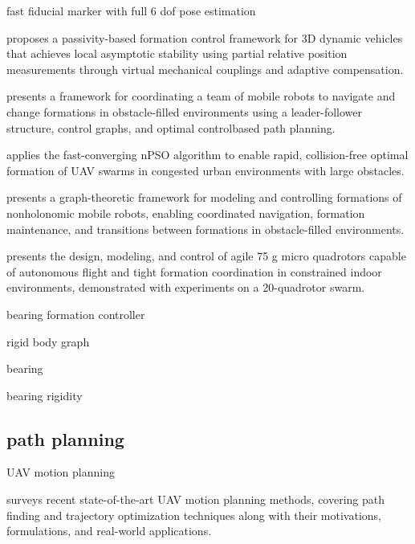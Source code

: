 \cite{ulrich2022towards} fast fiducial marker with full 6 dof pose estimation

\cite{stacey2015passivity} proposes a passivity-based formation control framework for 3D dynamic vehicles that achieves local asymptotic stability using partial relative position measurements through virtual mechanical couplings and adaptive compensation.

\cite{desai1999control} presents a framework for coordinating a team of mobile robots to navigate and change formations in obstacle-filled environments using a leader-follower structure, control graphs, and optimal control\-based path planning.

\cite{spanogianopoulos2017fast} applies the fast-converging nPSO algorithm to enable rapid, collision-free optimal formation of UAV swarms in congested urban environments with large obstacles.

\cite{desai2002modeling} presents a graph-theoretic framework for modeling and controlling formations of nonholonomic mobile robots, enabling coordinated navigation, formation maintenance, and transitions between formations in obstacle-filled environments.

\cite{kushleyev2013towards} presents the design, modeling, and control of agile 75 g micro quadrotors capable of autonomous flight and tight formation coordination in constrained indoor environments, demonstrated with experiments on a 20-quadrotor swarm.


\cite{schiano2016rigidity} bearing formation controller

rigid body graph
\cite{yang2018growing}
\cite{mehdifar2018finite}

bearing
\cite{zhao2015translational}
\cite{zhao2015bearing}
\cite{li2020adaptive}
\cite{li2021adaptive}
\cite{li2020bearing}
\cite{zhao2021finite}
\cite{zhang2022distributed}
\cite{zhang2023bearing}
\cite{arrigoni2018bearing}
\cite{zhao2019bearing}
\cite{trinh2018bearing}
\cite{trinh2021finite}

bearing rigidity
\cite{tay1985generating}
\cite{eren2012formation}
\cite{trinh2019minimal}
\cite{karimian2017theory}
\cite{hou2016elementary}
\cite{carboni2014rigidity}


\subsection{path planning}

UAV motion planning

\cite{quan2020survey} surveys recent state-of-the-art UAV motion planning methods, covering path finding and trajectory optimization techniques along with their motivations, formulations, and real-world applications.


